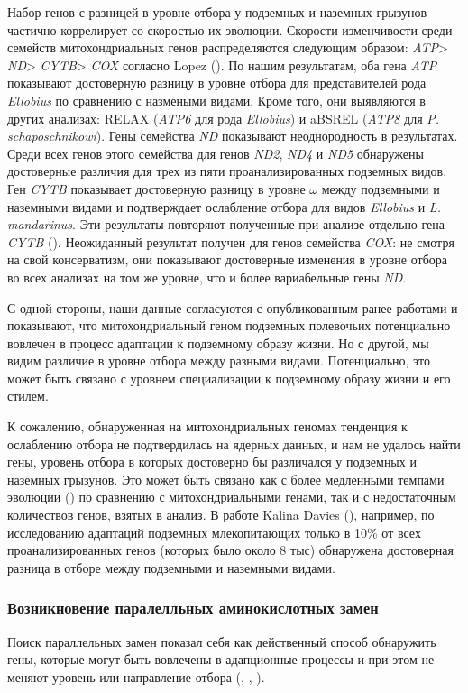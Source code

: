 Набор генов с разницей в уровне отбора у подземных и наземных грызунов частично коррелирует со скоростью их эволюции. Скорости изменчивости среди семейств митохондриальных генов распределяются следующим образом: \textit{ATP}> \textit{ND}> \textit{CYTB}> \textit{COX} согласно Lopez (\cite{Lopez1997}). По нашим результатам, оба гена \textit{ATP} показывают достоверную разницу в уровне отбора для представителей рода \textit{Ellobius} по сравнению с назмеными видами. Кроме того, они выявляются в других анализах: RELAX (\textit{ATP6} для рода \textit{Ellobius}) и aBSREL (\textit{ATP8} для \textit{P. schaposchnikowi}). Гены семейства \textit{ND} показывают неоднородность в результатах. Среди всех генов этого семейства для генов \textit{ND2}, \textit{ND4} и \textit{ND5} обнаружены достоверные различия для трех из пяти проанализированных подземных видов. Ген \textit{CYTB} показывает достоверную разницу в уровне $\omega$ между подземными и наземными видами и подтверждает ослабление отбора для видов \textit{Ellobius} и \textit{L. mandarinus}. Эти результаты повторяют полученные при анализе отдельно гена \textit{CYTB} (\cite{Bondareva2021}). Неожиданный результат получен для генов семейства \textit{COX}: не смотря на свой консерватизм, они показывают достоверные изменения в уровне отбора во всех анализах на том же уровне, что и более вариабельные гены \textit{ND}.


С одной стороны, наши данные согласуются с опубликованным ранее работами и показывают, что митохондриальный геном подземных полевочьих потенциально вовлечен в процесс адаптации к подземному образу жизни. Но с другой, мы видим различие в уровне отбора между разными видами. Потенциально, это может быть связано с уровнем специализации к подземному образу жизни и его стилем.


К сожалению, обнаруженная на митохондриальных геномах тенденция к ослаблению отбора не подтвердилась на ядерных данных, и нам не удалось найти гены, уровень отбора в которых достоверно бы различался у подземных и наземных грызунов. Это может быть связано как с более медленными темпами эволюции (\cite{Lin2004}) по сравнению с митохондриальными генами, так и с недостаточным количествов генов, взятых в анализ. В работе Kalina Davies (\cite{Davies2018}), например, по исследованию адаптаций подземных млекопитающих только в 10\% от всех проанализированных генов (которых было около 8 тыс) обнаружена достоверная разница в отборе между подземными и наземными видами. 


\subsubsection*{Возникновение паралелльных аминокислотных замен}
Поиск параллельных замен показал себя как действенный способ обнаружить гены, которые могут быть вовлечены в адапционные процессы и при этом не меняют уровень или направление отбора (\cite{Davies2018}, \cite{Zhou2015}, \cite{Sackman2017}). 

